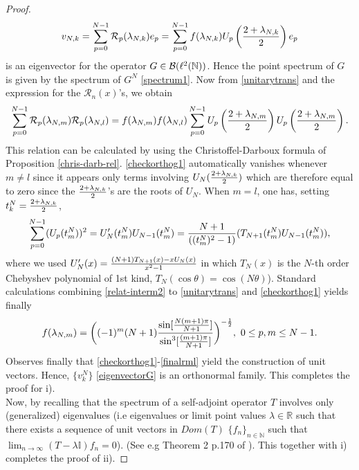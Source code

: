 \documentclass[a4paper,11pt,twoside]{article}
\numberwithin{equation}{section}
\newcommand\bbone{{ \mathbb{I}}}
\theoremstyle{nonumberplain}
\newtheorem{proof}{Proof}
\begin{document}
\begin{proof}
\begin{equation}
v_{N,k}=\sum_{p=0}^{N-1}{\cal{R}}_{p}(\lambda_{N,k})e_p=\sum_{p=0}^{N-1}f(\lambda_{N,k})U_p\left({{2+\lambda_{N,k}}\over{2}}\right)e_p\label{eigenvectorG}
\end{equation}
is an eigenvector for the operator $G\in{\cal{B}}(\ell^2(\mathbb{N}))$. Hence the point spectrum of $G$ is given by the spectrum of $G^N$ \eqref{spectrum1}. Now from \eqref{unitarytrans} and the expression for the $\mathcal{R}_n(x)$'s, we obtain 
\begin{equation}
\sum_{p=0}^{N-1}{\cal{R}}_p(\lambda_{N,m}){\cal{R}}_p(\lambda_{N,l})=f(\lambda_{N,m})f(\lambda_{N,l})\sum_{p=0}^{N-1}
U_p\left(\frac{2+\lambda_{N,m}}{2}\right)U_p\left(\frac{2+\lambda_{N,m}}{2}\right)\label{checkorthog1}.
\end{equation}
This relation can be calculated by using the Christoffel-Darboux formula of Proposition \ref{chris-darb-rel}. \eqref{checkorthog1} automatically vanishes whenever $m\ne l$ since it appears only terms involving $U_N({{2+\lambda_{N,k}}\over{2}})$ which are therefore equal to zero since the ${{2+\lambda_{N,k}}\over{2}}$'s are the roots of $U_N$. When $m=l$, one has, setting $t^N_k={{2+\lambda_{N,k}}\over{2}}$,
\begin{equation}
\sum_{p=0}^{N-1}(U_p(t^N_m))^2=U_N^\prime(t^N_m)U_{N-1}(t^N_m)={{N+1}\over{((t^N_m)^2-1)}}(T_{N+1}(t^N_m)U_{N-1}(t^N_m))\label{relat-interm2},
\end{equation}
where we used $U^\prime_N(x)={{(N+1)T_{N+1}(x)-xU_N(x) }\over{x^2-1 }}$ in which $T_N(x)$ is the $N$-th order Chebyshev polynomial of 1st kind, $T_N(\cos\theta)=\cos(N\theta)$). Standard calculations combining \eqref{relat-interm2} to \eqref{unitarytrans} and \eqref{checkorthog1} yields finally
\begin{equation}
f(\lambda_{N,m})=\bigg((-1)^m(N+1){{ \sin[{{N(m+1)\pi }\over{N+1 }}  ]}\over {\sin^3[{{(m+1)\pi }\over{N+1 }} ] }} \bigg)^{-{{1}\over{2}}},\ 0\le p,m\le N-1\label{finalrml}.
\end{equation}
Observes finally that \eqref{checkorthog1}-\eqref{finalrml} yield the construction of unit vectors. Hence, $\{v^N_k\}$ \eqref{eigenvectorG} is an orthonormal family. This completes the proof for i). \\
Now, by recalling that the spectrum of a self-adjoint operator $T$ involves only (generalized) eigenvalues (i.e eigenvalues or limit point values $\lambda\in\mathbb{R}$ such that there exists a sequence of unit vectors in $Dom(T)$ $\{f_n\}_{n\in\mathbb{N}}$ such that $\lim_{n\to\infty}(T-\lambda\bbone)f_n=0$). (See e.g Theorem 2 p.170 of \cite{helmberg}). This together with i) completes the proof of ii).
\end{proof}
\end{document}
